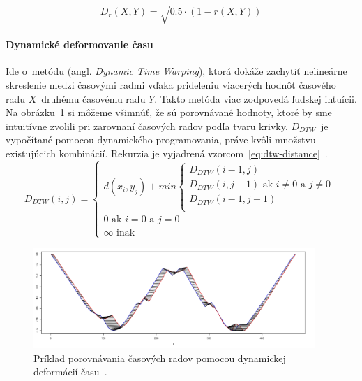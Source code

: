 \documentclass[a4paper,twoside,slovak,12pt,appendix]{article}
\begin{document}
\begin{equation}
	\label{eq:correlation-distance}
  D_r \left( X, Y \right) = \sqrt{0.5 \cdot \left( 1 - r \left( X, Y \right) \right)}
\end{equation}


\paragraph{Dynamické deformovanie času}
Ide o~metódu (angl. \textit{Dynamic Time Warping}), ktorá dokáže zachytiť
nelineárne skreslenie medzi časovými radmi vďaka prideleniu viacerých hodnôt
časového radu $X$~druhému časovému radu $Y$. Takto metóda viac zodpovedá ľudskej
intuícii. Na obrázku~\ref{fig:warping-distance} si môžeme všimnúť, že sú
porovnávané hodnoty, ktoré by sme intuitívne zvolili pri zarovnaní časových
radov podľa tvaru krivky. $D_{DTW}$~je vypočítané pomocou dynamického
programovania, práve kvôli množstvu existujúcich kombinácií. Rekurzia je
vyjadrená vzorcom~\ref{eq:dtw-distance}~\cite{Dzeroski2007,Fu2011}.
\begin{equation}
	\label{eq:dtw-distance}
  D_{DTW} \left( i, j \right) =
  \begin{cases}
    d \left( x_i, y_j \right) + min
    \begin{cases}
      D_{DTW} \left( i-1, j \right) \\
      D_{DTW} \left( i, j-1 \right) \text{ ak } i \neq 0 \text{ a } j \neq 0  \\
      D_{DTW} \left( i-1, j-1 \right) \\
    \end{cases} \\
    0 \text{ ak } i = 0 \text{ a } j = 0 \\
    \infty \text{ inak}
  \end{cases}
\end{equation}

\begin{figure}[]
  \centering
  \includegraphics[width=0.95\textwidth]{warping-distance.png}
  \caption{Príklad porovnávania časových radov pomocou dynamickej deformácií času~\cite{Malinowski2017}.}
  \label{fig:warping-distance}
\end{figure}
\end{document}
